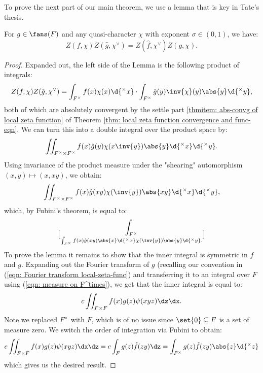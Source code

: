 \documentclass[11pt, x11names, openany]{book}
\begin{document}
To prove the next part of our main theorem, we use a lemma that is key in Tate's thesis. 
\begin{lemma}
\label{lemma: local-zeta-func func eqn}
    For $g \in \fans(F)$ and any quasi-character $\chi$ with exponent $\sigma \in (0, 1)$, we have:
    \begin{equation*}
        Z(f, \chi) Z(\hat{g}, \chi^\lor) = Z(\hat{f}, \chi^\lor)Z(g, \chi).
    \end{equation*}
\end{lemma}
\begin{proof}
Expanded out, the left side of the Lemma is the following product of integrals:
\begin{equation*}
    Z(f, \chi) Z(\hat{g}, \chi^\lor) = \int_{F^\times} f(x) \chi(x) \d{^\times x} \cdot \int_{F^\times} \hat{g}(y) \inv{\chi}(y) \abs{y} \d{^\times  y},
\end{equation*}
both of which are absolutely convergent by the settle part \ref{thmitem: abs-convg of local zeta function} of Theorem \ref{thm: local zeta function convergence and func-eqn}. We can turn this into a double integral over the product space by:
\begin{equation*}
    \iint_{F^\times \times F^\times} f(x)\hat{g}(y) \chi(x \inv{y}) \abs{y} \d{^\times x} \d{^\times  y}.
\end{equation*}
Using invariance of the product measure under the "shearing" automorphism $(x, y) \mapsto (x, xy)$, we obtain:
\begin{equation*}
    \iint_{F^\times \times F^\times} f(x)\hat{g}(xy)\chi(\inv{y}) \abs{xy} \d{^\times x} \d{^\times  y},
\end{equation*}
which, by Fubini's theorem, is equal to:
\begin{equation*}
    \int_{F^\times} \brack{\int_{F^\times} f(x)\hat{g}(xy) \abs{x} \d{^\times x}} \chi(\inv{y}) \abs{y} \d{^\times  y}.
\end{equation*}
To prove the lemma it remains to show that the inner integral is symmetric in $f$ and $g$. Expanding out the Fourier transform of $g$ (recalling our convention in  (\ref{eqn: Fourier transform local-zeta-func}) and transferring it to an integral over $F$ using (\ref{eqn: measure on F^times}), we get that the inner integral is equal to:
\begin{equation*}
    c \iint_{F \times F} f(x) g(z) \psi(xyz) \dz \dx.
\end{equation*}
Note we replaced $F^\times$ with $F$, which is of no issue since $\set{0} \subseteq F$ is a set of measure zero. We switch the order of integration via Fubini to obtain:
\begin{equation*}
    c \iint_{F \times F} f(x) g(z) \psi(xyz) \dx \dz = c \int_F g(z) \hat{f}(zy) \dz = \int_{F^\times}  g(z) \hat{f}(zy) \abs{z} \d{^\times  z}
\end{equation*}
which gives us the desired result.
\end{proof}
\end{document}
